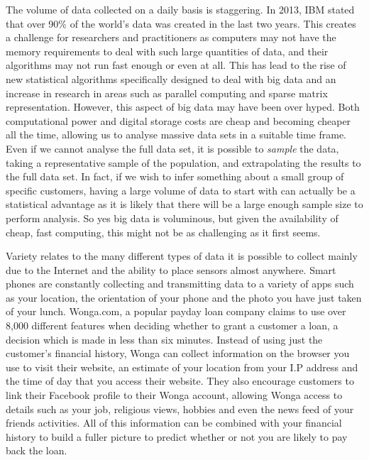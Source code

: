 The volume of data collected on a daily basis is staggering.  In 2013,  IBM stated  that over 90\% of the world's data was created in the last two years. This creates a challenge for researchers and practitioners as computers may not have the memory requirements to deal with such large quantities of data, and their algorithms may not run fast enough or even at all. This has lead to the rise of new statistical algorithms specifically designed to deal with big data and an increase in research in areas such as parallel computing and sparse matrix representation. However, this aspect of big data may have been over hyped. Both computational power and digital storage costs are cheap and becoming cheaper all the time, allowing us to analyse massive data sets in a suitable time frame. Even if we cannot analyse the full data set, it is possible to \textit{sample} the data, taking a representative sample of the population, and extrapolating the results to the full data set. In fact, if we wish to infer something about a small group of specific customers, having a large volume of data to start with can actually be a statistical advantage as it is likely that there will be a large enough sample size to perform analysis. So yes big data is voluminous, but given the availability of cheap, fast computing, this might not be as challenging as it first seems. 

Variety relates to the many different types of data it is possible to collect  mainly due to the Internet and the ability to place sensors almost anywhere. Smart phones are constantly collecting and transmitting data to a variety of apps such as your location, the orientation of your phone and the photo you have just taken of your lunch. Wonga.com, a popular payday loan company claims to use over 8,000 different features when deciding whether to grant a customer a loan, a decision which is made in less than six minutes. Instead of  using just the customer's financial history, Wonga can collect information on the browser you use to visit their website, an estimate of your location from your I.P address and the time of day that you access their website. They also encourage customers to link their Facebook profile to their Wonga account, allowing Wonga access to details such as your job, religious views, hobbies and even the news feed of your friends activities.  All of this information can be combined with your financial history to build a fuller picture to predict whether or not you are likely to pay back the loan. 

